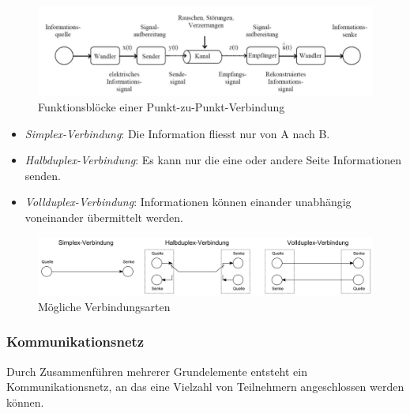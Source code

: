 \documentclass[
  10pt,
  a4paper,
  german]{article}
\numberwithin{equation}{section}
\begin{document}
\begin{figure}[H]

{\centering \includegraphics{images/01_PunktZuPunkt.png}

}

\caption{Funktionsblöcke einer Punkt-zu-Punkt-Verbindung}

\end{figure}

\begin{itemize}
\item
  \emph{Simplex-Verbindung}: Die Information fliesst nur von A nach B.
\item
  \emph{Halbduplex-Verbindung}: Es kann nur die eine oder andere Seite
  Informationen senden.
\item
  \emph{Vollduplex-Verbindung}: Informationen können einander unabhängig
  voneinander übermittelt werden.
\end{itemize}

\begin{figure}[H]

{\centering \includegraphics{images/01_Verbindungsarten.png}

}

\caption{Mögliche Verbindungsarten}

\end{figure}

\hypertarget{kommunikationsnetz}{%
\subsubsection{Kommunikationsnetz}\label{kommunikationsnetz}}

Durch Zusammenführen mehrerer Grundelemente entsteht ein
Kommunikationsnetz, an das eine Vielzahl von Teilnehmern angeschlossen
werden können.
\end{document}
